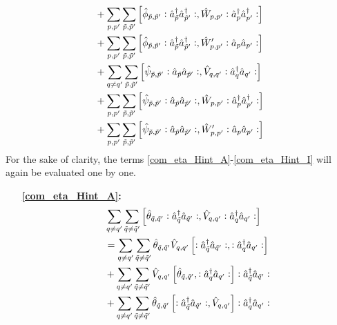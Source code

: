 \begin{appendix}
\begin{subequations}
\begin{align}
&+ \sum\limits_{p, p^\prime}\sum\limits_{\tilde p,\tilde p^\prime} \left[\hat\phi_{\tilde p,\tilde p^\prime}\vcentcolon\hat a^\dagger_{\tilde p}\hat a^\dagger_{\tilde p^\prime}\vcentcolon,\hat W_{p,p^\prime}\vcentcolon\hat a^\dagger_p\hat a^\dagger_{p^\prime}\vcentcolon\right]\label{com_eta_Hint_E}\\
&+ \sum\limits_{p, p^\prime}\sum\limits_{\tilde p,\tilde p^\prime} \left[\hat\phi_{\tilde p,\tilde p^\prime}\vcentcolon\hat a^\dagger_{\tilde p}\hat a^\dagger_{\tilde p^\prime}\vcentcolon,\hat W_{p,p^\prime}^\prime\vcentcolon\hat a_p\hat a_{p^\prime}\vcentcolon\right]\label{com_eta_Hint_F}\\
&+ \sum\limits_{q\neq q^\prime}\sum\limits_{\tilde p,\tilde p^\prime} \left[\hat\psi_{\tilde p,\tilde p^\prime}\vcentcolon\hat a_{\tilde p}\hat a_{\tilde p^\prime}\vcentcolon,\hat V_{q,q^\prime}\vcentcolon\hat a^\dagger_q\hat a_{q^\prime}\vcentcolon\right] \label{com_eta_Hint_G} \\
&+ \sum\limits_{p, p^\prime}\sum\limits_{\tilde p,\tilde p^\prime} \left[\hat\psi_{\tilde p,\tilde p^\prime}\vcentcolon\hat a_{\tilde p}\hat a_{\tilde p^\prime}\vcentcolon,\hat W_{p,p^\prime}\vcentcolon\hat a^\dagger_p\hat a^\dagger_{p^\prime}\vcentcolon\right]\label{com_eta_Hint_H}\\
&+ \sum\limits_{p, p^\prime}\sum\limits_{\tilde p,\tilde p^\prime} \left[\hat\psi_{\tilde p,\tilde p^\prime}\vcentcolon\hat a_{\tilde p}\hat a_{\tilde p^\prime}\vcentcolon,\hat W_{p,p^\prime}^\prime\vcentcolon\hat a_p\hat a_{p^\prime}\vcentcolon\right]\label{com_eta_Hint_I}
\end{align}
\end{subequations}
For the sake of clarity, the terms \ref{com_eta_Hint_A}-\ref{com_eta_Hint_I} will again be evaluated one by one.
\begin{itemize}
\item[\textbf{\ref{com_eta_Hint_A}:}]
\begin{align}
&\Sum_{q\neq q^\prime}\Sum_{\tilde q\neq\tilde q^\prime} \left[\hat\theta_{\tilde q,\tilde q^\prime}\NO\CR_{\tilde q}\AN_{\tilde q^\prime}\NO,\hat V_{q,q^\prime}\NO\CR_q\AN_{q^\prime}\NO\right]\nonumber \\
&=\Sum_{q\neq q^\prime}\Sum_{\tilde q\neq\tilde q^\prime} \hat\theta_{\tilde q,\tilde q^\prime}\hat V_{q,q^\prime}\left[\NO\CR_{\tilde q}\AN_{\tilde q^\prime}\NO,\NO\CR_q\AN_{q^\prime}\NO\right] \nonumber \\
&+\Sum_{q\neq q^\prime}\Sum_{\tilde q\neq\tilde q^\prime} \hat V_{q,q^\prime}\left[\hat\theta_{\tilde q,\tilde q^\prime},\NO\CR_q\AN_{q^\prime}\NO\right]\NO\CR_{\tilde q}\AN_{\tilde q^\prime}\NO\nonumber \\
&+\Sum_{q\neq q^\prime}\Sum_{\tilde q\neq\tilde q^\prime} \hat\theta_{\tilde q,\tilde q^\prime}\left[\NO\CR_{\tilde q}\AN_{\tilde q^\prime}\NO,\hat V_{q,q^\prime}\right]\NO\CR_q\AN_{q^\prime}\NO\nonumber \\

\end{align}
\end{itemize}
\end{appendix}
